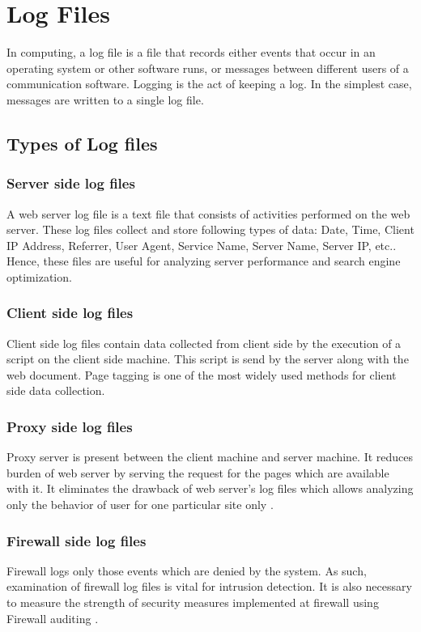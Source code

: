 \documentclass[12pt,a4paper]{report}
\begin{document}
\section{Log Files}
In computing, a log file is a file that records either events that occur in an operating system or other software runs, or messages between different users of a communication software. Logging is the act of keeping a log. In the simplest case, messages are written to a single log file.
\subsection{Types of Log files}
\subsubsection{Server side log files}
A web server log file is a text file that consists of activities performed on the web server. These log files collect and store following types of data: Date, Time, Client IP Address, Referrer, User Agent, Service Name, Server Name, Server IP, etc.. Hence, these files are useful for analyzing server performance and search engine optimization.
\subsubsection{Client side log files}
Client side log files contain data collected from client side by the execution of a script on the client side machine. This script is send by the server along with the web document. Page tagging is one of the most widely used methods for client side data collection.
\subsubsection{Proxy side log files}
Proxy server is present between the client machine and server machine. It reduces burden of web server by serving the request for the pages which are available with it. It eliminates the drawback of web server's log files which allows analyzing only the behavior of user for one particular site only .
\subsubsection{Firewall side log files}
Firewall logs only those events which are denied by the system. As such, examination of firewall log files is vital for intrusion detection. It is also necessary to measure the strength of security measures implemented at firewall using Firewall auditing .
\end{document}
